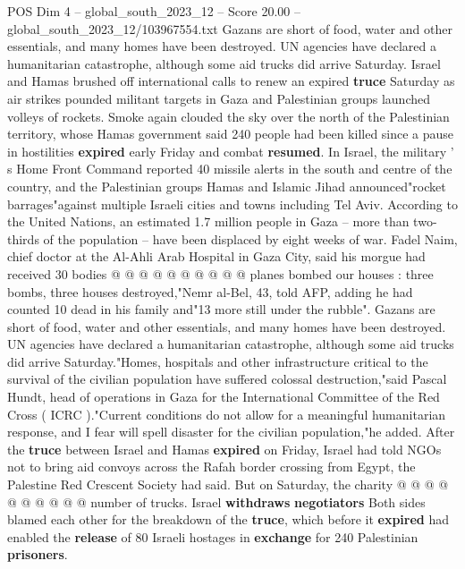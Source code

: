 \begin{textsample}{POS Dim 4 – global\_south\_2023\_12 – Score 20.00 – global\_south\_2023\_12/103967554.txt}  \label{ex:f4_pos_133}
Gazans are short of food, water and other essentials, and many homes have been destroyed.
UN agencies have declared a humanitarian catastrophe, although some aid trucks did arrive Saturday.
Israel and Hamas brushed off international calls to renew an expired \textbf{truce} Saturday as air strikes pounded militant targets in Gaza and Palestinian groups launched volleys of rockets.
Smoke again clouded the sky over the north of the Palestinian territory, whose Hamas government said 240 people had been killed since a pause in hostilities \textbf{expired} early Friday and combat \textbf{resumed}.
In Israel, the military ' s Home Front Command reported 40 missile alerts in the south and centre of the country, and the Palestinian groups Hamas and Islamic Jihad announced"rocket barrages"against multiple Israeli cities and towns including Tel Aviv.
According to the United Nations, an estimated 1.7 million people in Gaza -- more than two-thirds of the population -- have been displaced by eight weeks of war.
Fadel Naim, chief doctor at the Al-Ahli Arab Hospital in Gaza City, said his morgue had received 30 bodies @ @ @ @ @ @ @ @ @ @ planes bombed our houses : three bombs, three houses destroyed,"Nemr al-Bel, 43, told AFP, adding he had counted 10 dead in his family and"13 more still under the rubble".
Gazans are short of food, water and other essentials, and many homes have been destroyed.
UN agencies have declared a humanitarian catastrophe, although some aid trucks did arrive Saturday."Homes, hospitals and other infrastructure critical to the survival of the civilian population have suffered colossal destruction,"said Pascal Hundt, head of operations in Gaza for the International Committee of the Red Cross ( ICRC )."Current conditions do not allow for a meaningful humanitarian response, and I fear will spell disaster for the civilian population,"he added.
After the \textbf{truce} between Israel and Hamas \textbf{expired} on Friday, Israel had told NGOs not to bring aid convoys across the Rafah border crossing from Egypt, the Palestine Red Crescent Society had said.
But on Saturday, the charity @ @ @ @ @ @ @ @ @ @ number of trucks.
Israel \textbf{withdraws} \textbf{negotiators} Both sides blamed each other for the breakdown of the \textbf{truce}, which before it \textbf{expired} had enabled the \textbf{release} of 80 Israeli hostages in \textbf{exchange} for 240 Palestinian \textbf{prisoners}.

\end{textsample}
